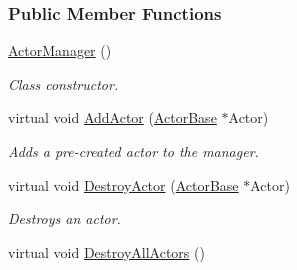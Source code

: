 \subsubsection*{Public Member Functions}
\begin{DoxyCompactItemize}
\item 
\hypertarget{classphys_1_1ActorManager_a725d0454ff57bd439c9f3938b1e76ca6}{
\hyperlink{classphys_1_1ActorManager_a725d0454ff57bd439c9f3938b1e76ca6}{ActorManager} ()}
\label{classphys_1_1ActorManager_a725d0454ff57bd439c9f3938b1e76ca6}

\begin{DoxyCompactList}\small\item\em Class constructor. \item\end{DoxyCompactList}\item 
virtual void \hyperlink{classphys_1_1ActorManager_abde76a5c732b77d7bab431d0ef0220ae}{AddActor} (\hyperlink{classphys_1_1ActorBase}{ActorBase} $\ast$Actor)
\begin{DoxyCompactList}\small\item\em Adds a pre-\/created actor to the manager. \item\end{DoxyCompactList}\item 
virtual void \hyperlink{classphys_1_1ActorManager_ad6770c0435aef34f359a43f4038b336b}{DestroyActor} (\hyperlink{classphys_1_1ActorBase}{ActorBase} $\ast$Actor)
\begin{DoxyCompactList}\small\item\em Destroys an actor. \item\end{DoxyCompactList}\item 
\hypertarget{classphys_1_1ActorManager_a41f436d640f344000b02978ce6a661e5}{
virtual void \hyperlink{classphys_1_1ActorManager_a41f436d640f344000b02978ce6a661e5}{DestroyAllActors} ()}
\label{classphys_1_1ActorManager_a41f436d640f344000b02978ce6a661e5}


\end{DoxyCompactItemize}
